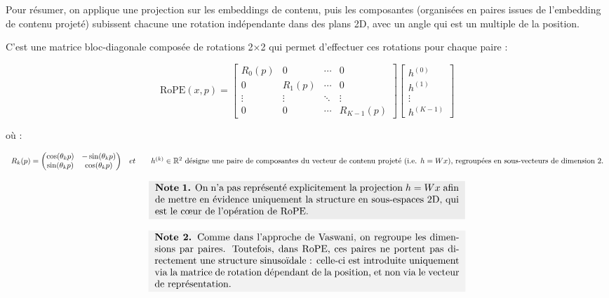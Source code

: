 \documentclass{article}
\begin{document}
Pour résumer, on applique une projection sur les embeddings de contenu, puis les composantes (organisées en paires issues de l’embedding de contenu projeté) subissent chacune une rotation indépendante dans des plans 2D, avec un angle qui est un multiple de la position.

C’est une matrice bloc-diagonale composée de rotations 2×2 qui permet d'effectuer ces rotations pour chaque paire :


\[
\mathrm{RoPE}(x,p)
=
\begin{bmatrix}
R_0(p) & 0 & \cdots & 0 \\
0 & R_1(p) & \cdots & 0 \\
\vdots & \vdots & \ddots & \vdots \\
0 & 0 & \cdots & R_{K-1}(p)
\end{bmatrix}
\begin{bmatrix}
h^{(0)} \\
h^{(1)} \\
\vdots \\
h^{(K-1)}
\end{bmatrix}
\]

où :

\[
\begin{array}{c c}
R_k(p) =
\begin{pmatrix}
\cos(\theta_k p) & -\sin(\theta_k p) \\
\sin(\theta_k p) & \cos(\theta_k p)
\end{pmatrix}
&
et \qquad h^{(k)} \in \mathbb{R}^2 \text{ désigne une paire de composantes du vecteur de contenu projeté (i.e. } h = Wx\text{), regroupées en sous-vecteurs de dimension 2.}
\end{array}
\]

\[
\colorbox{gray!15}{
\begin{minipage}{0.9\linewidth}
\textbf{Note 1.} On n'a pas représenté explicitement la projection $h = Wx$ afin de mettre en évidence uniquement la structure en sous-espaces 2D, qui est le cœur de l’opération de RoPE.
\end{minipage}
}
\]

\[
\colorbox{gray!10}{
\begin{minipage}{0.9\linewidth}
\textbf{Note 2.} Comme dans l’approche de Vaswani, on regroupe les dimensions par paires. Toutefois, dans RoPE, ces paires ne portent pas directement une structure sinusoïdale : celle-ci est introduite uniquement via la matrice de rotation dépendant de la position, et non via le vecteur de représentation.
\end{minipage}
}
\]
\end{document}
